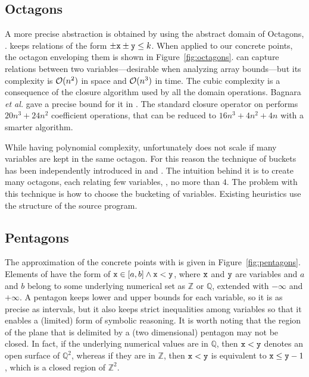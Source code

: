 \documentclass{elsart}
\begin{document}
\subsection{Octagons}
A more precise abstraction is obtained by using the abstract domain of Octagons, \Octagons. 
\Octagons{} keeps relations of the form $\pm \mathtt{x} \pm \mathtt{y} \leq k$.
When applied to our concrete points, the octagon enveloping them is shown in Figure~\ref{fig:octagons}.
\Octagons{} can capture relations between two variables---desirable
when analyzing array bounds---but its complexity is $\mathcal{O}(n^2)$ in space and $\mathcal{O}(n^3)$ in time.
The cubic complexity is a consequence of the closure algorithm used by all the domain operations.
Bagnara \emph{et al.} gave a precise bound for it in \cite{Bagnara05}. The standard closure operator on \Octagons{} performs $20 n^3 + 24  n^2$ coefficient operations, that can be reduced to $16n^3 + 4n^2 +4n$ with a smarter algorithm.

While having polynomial complexity, \Octagons{} unfortunately does not
scale if many variables are kept in the same octagon.
For this reason the technique of buckets has been independently introduced in  \cite{BlanchetCousotEtAl03} and \cite{Venet04}.
The intuition behind it is to create many octagons, each relating few variables, \eg,  no more than $4$.
The problem with this technique is how to choose the bucketing of
variables. Existing heuristics use the structure of the source program.

\subsection{Pentagons}
The approximation of the concrete points with \Pentagons{} is given in Figure~\ref{fig:pentagons}.
Elements of \Pentagons{} have the form of $\mathtt{x} \in [a, b] \wedge \mathtt{x} < \mathtt{y}$, where $\mathtt{x}$ and $\mathtt{y}$ are variables and $a$ and $b$ belong to some underlying numerical set as $\mathbb{Z}$ or $\mathbb{Q}$, extended with $-\infty$ and $+\infty$.
A pentagon keeps lower and upper bounds for each variable, so it is as precise as intervals, but it also keeps strict inequalities among variables so that it enables a (limited) form of symbolic reasoning.
It is worth noting that the region of the plane that is delimited by a (two dimensional) pentagon may not be closed.
In fact, if the underlying numerical values are in $\mathbb{Q}$, then $\mathtt{x} < \mathtt{y}$ denotes an open surface of $\mathbb{Q}^2$, whereas if they are in $\mathbb{Z}$, then $\mathtt{x} < \mathtt{y}$ is equivalent to $\mathtt{x} \leq \mathtt{y} -1$, which is a closed region of $\mathbb{Z}^2$.
\end{document}

